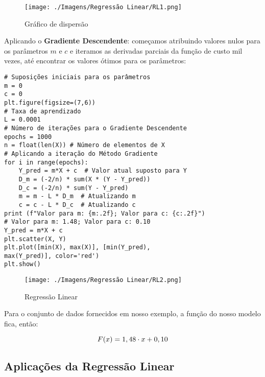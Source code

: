 \begin{figure}[H]
	\centering
	\texttt{[image: ./Imagens/Regressão Linear/RL1.png]} 
	\caption{Gráfico de dispersão}
	\label{fig:RL1}
\end{figure}

Aplicando o \textbf{Gradiente Descendente}: começamos atribuindo valores nulos para os parâmetros $m$ e $c$ e iteramos as derivadas parciais da função de custo mil vezes, até encontrar os valores ótimos para os parâmetros:

\begin{verbatim}
# Suposições iniciais para os parâmetros
m = 0
c = 0
plt.figure(figsize=(7,6))
# Taxa de aprendizado
L = 0.0001  
# Número de iterações para o Gradiente Descendente
epochs = 1000  
n = float(len(X)) # Número de elementos de X
# Aplicando a iteração do Método Gradiente 
for i in range(epochs): 
	Y_pred = m*X + c  # Valor atual suposto para Y
	D_m = (-2/n) * sum(X * (Y - Y_pred)) 
	D_c = (-2/n) * sum(Y - Y_pred) 
	m = m - L * D_m  # Atualizando m
	c = c - L * D_c  # Atualizando c
print (f"Valor para m: {m:.2f}; Valor para c: {c:.2f}")
# Valor para m: 1.48; Valor para c: 0.10
Y_pred = m*X + c
plt.scatter(X, Y) 
plt.plot([min(X), max(X)], [min(Y_pred), 
max(Y_pred)], color='red')
plt.show()
\end{verbatim}

\begin{figure}[H]
	\centering
	\texttt{[image: ./Imagens/Regressão Linear/RL2.png]} 
	\caption{Regressão Linear}
	\label{fig:RL2}
\end{figure}

Para o conjunto de dados fornecidos em nosso exemplo, a função do nosso modelo fica, então:

\[ \large F(x) = 1,48 \cdot x + 0,10 \]

\subsection{Aplicações da Regressão Linear}

